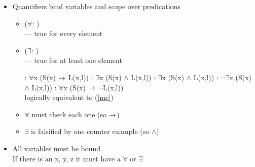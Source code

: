 \documentclass[a4paper,landscape,headrule,footrule,xetex]{foils}
\begin{document}
\begin{itemize}\addtolength{\itemsep}{-1ex}
  \item Quantifiers bind variables and scope over predications
    \begin{itemize}
    \item {} ($\forall$: )
      \hfill {} \\
      --- true for every element \hfill {}
    \item {} ($\exists$: )
      \hfill {} \\
      --- true for at least one element \hfill {} 
    \begin{exe}
      \ex {}: $\forall$x (S(x)  $\rightarrow$ L(x,l))
      \ex {}: $\exists$x (S(x)  $\wedge$ L(x,l))
      \ex {}: $\exists$x (S(x)  $\wedge$ L(x,l))
      \ex\label{me} : $\neg\exists$x (S(x)  $\wedge$ L(x,l))
      \ex {}: $\forall$x (S(x)  $\rightarrow$ $\neg$L(x,l))
      \\ logically equivalent to (\ref{me})
    \end{exe}
  \item $\forall$ must check each one (so $\rightarrow$)
  \item $\exists$ is falsified by one counter example  (so $\wedge$)
    \end{itemize}

  \item All variables must be bound \\
    If there is an x, y, z it must have a $\forall$ or $\exists$
\end{itemize}

\end{document}

